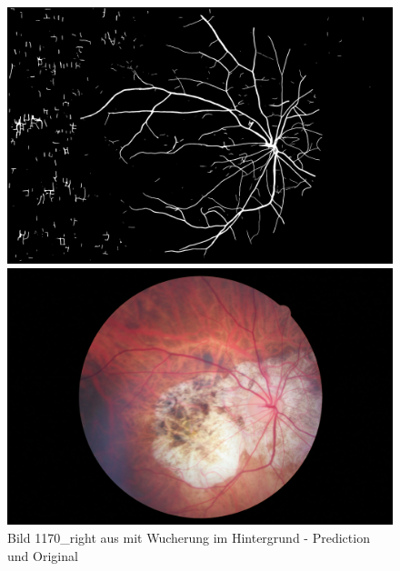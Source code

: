 \begin{figure}[H]
\begin{minipage}{.5\textwidth}
\includegraphics[width=\textwidth]{Pictures/nnUnet/Praxis/Task205-Augen-minimal-13-trainsamples/extra_Bilder/1170_right.png}
\end{minipage}
\begin{minipage}{.5\textwidth}
\includegraphics[width=\textwidth]{Pictures/nnUnet/Praxis/Task205-Augen-minimal-13-trainsamples/extra_Bilder/1170_right-original.jpeg}
\end{minipage}
\caption{Bild 1170\_right aus \cite{retina2dExtra} mit Wucherung im Hintergrund - Prediction und Original}
\label{pic:retinaExtraB}
\end{figure}




